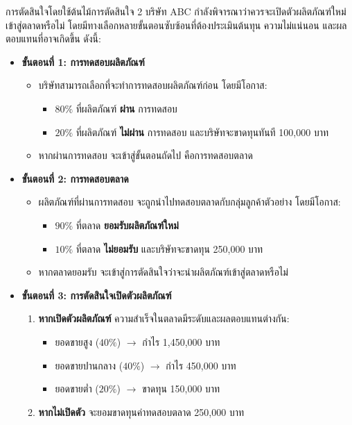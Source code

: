 \newpage
\begin{example}
    {การตัดสินใจโดยใช้ต้นไม้การตัดสินใจ 2}{}
    บริษัท ABC กำลังพิจารณาว่าควรจะเปิดตัวผลิตภัณฑ์ใหม่เข้าสู่ตลาดหรือไม่ โดยมีทางเลือกหลายขั้นตอนซับซ้อนที่ต้องประเมินต้นทุน ความไม่แน่นอน และผลตอบแทนที่อาจเกิดขึ้น ดังนี้:

\begin{itemize}
    \item \textbf{ขั้นตอนที่ 1: การทดสอบผลิตภัณฑ์}
    \begin{itemize}
        \item บริษัทสามารถเลือกที่จะทำการทดสอบผลิตภัณฑ์ก่อน โดยมีโอกาส:
        \begin{itemize}
            \item \(80\%\) ที่ผลิตภัณฑ์ \textbf{ผ่าน} การทดสอบ
            \item \(20\%\) ที่ผลิตภัณฑ์ \textbf{ไม่ผ่าน} การทดสอบ และบริษัทจะขาดทุนทันที 100,000 บาท
        \end{itemize}
        \item หากผ่านการทดสอบ จะเข้าสู่ขั้นตอนถัดไป คือการทดสอบตลาด
    \end{itemize}

    \item \textbf{ขั้นตอนที่ 2: การทดสอบตลาด}
    \begin{itemize}
        \item ผลิตภัณฑ์ที่ผ่านการทดสอบ จะถูกนำไปทดสอบตลาดกับกลุ่มลูกค้าตัวอย่าง โดยมีโอกาส:
        \begin{itemize}
            \item \(90\%\) ที่ตลาด \textbf{ยอมรับผลิตภัณฑ์ใหม่}
            \item \(10\%\) ที่ตลาด \textbf{ไม่ยอมรับ} และบริษัทจะขาดทุน 250,000 บาท
        \end{itemize}
        \item หากตลาดยอมรับ จะเข้าสู่การตัดสินใจว่าจะนำผลิตภัณฑ์เข้าสู่ตลาดหรือไม่
    \end{itemize}

    \item \textbf{ขั้นตอนที่ 3: การตัดสินใจเปิดตัวผลิตภัณฑ์ }
    \begin{enumerate}
        \item \textbf{หากเปิดตัวผลิตภัณฑ์} ความสำเร็จในตลาดมีระดับและผลตอบแทนต่างกัน:
        \begin{itemize}
            \item ยอดขายสูง (\(40\%\)) $\rightarrow$ กำไร 1,450,000 บาท
            \item ยอดขายปานกลาง (\(40\%\)) $\rightarrow$ กำไร 450,000 บาท
            \item ยอดขายต่ำ (\(20\%\)) $\rightarrow$ ขาดทุน 150,000 บาท
        \end{itemize}
        \item \textbf{หากไม่เปิดตัว} จะยอมขาดทุนค่าทดสอบตลาด 250,000 บาท
    \end{enumerate}


\end{itemize}
\end{example}
